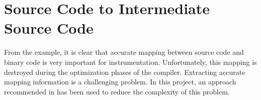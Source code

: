 
%
%
%

\section{Source Code to Intermediate Source Code}
From the example, it is clear that accurate mapping between source code and binary code is very important for instrumentation. Unfortunately, this mapping is destroyed during the optimization phases of the compiler. Extracting accurate mapping information is a challenging problem. In this project, an approach recommended in \cite{RBA2013} has been used to reduce the complexity of this problem.

